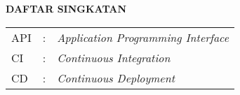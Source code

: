 \clearpage
{}
{}

\begin{center}
    \large \textbf{DAFTAR SINGKATAN}
\end{center}
\vspace{3em}

\begin{center}
    \begin{table}[htbp]
        \begin{tabular}{l l l}
            API             &:& \textit{Application Programming Interface} \\ %
            CI              &:& \textit{Continuous Integration}           \\ %
            CD              &:& \textit{Continuous Deployment}           \\ %
        \end{tabular}
    \end{table}
\end{center}


